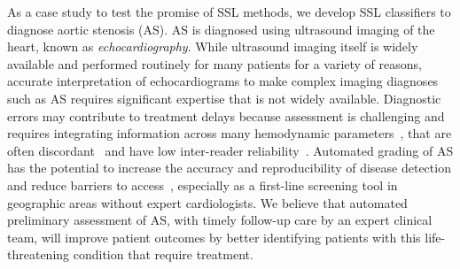 As a case study to test the promise of SSL methods, we develop SSL classifiers to diagnose aortic stenosis (AS). AS is diagnosed using ultrasound imaging of the heart, known as \emph{echocardiography}.
While ultrasound imaging itself is widely available and performed routinely for many patients for a variety of reasons, accurate interpretation of echocardiograms to make complex imaging diagnoses such as AS requires significant expertise that is not widely available.
Diagnostic errors may contribute to treatment delays because assessment is challenging and requires integrating information across many hemodynamic parameters~\citep{baumgartnerRecommendationsEchocardiographicAssessment2017}, that are often discordant~\citep{minnersInconsistenciesEchocardiographicCriteria2008} and have low inter-reader reliability~\citep{sacchiDopplerAssessmentAortic2018}.
Automated grading of AS has the potential to increase the accuracy and reproducibility of disease detection and reduce barriers to access~\citep{batchelorAorticValveStenosis2019}, especially as a first-line screening tool in geographic areas without expert cardiologists.
We believe that automated preliminary assessment of AS, with timely follow-up care by an expert clinical team, will improve patient outcomes by better identifying patients with this life-threatening condition that require treatment.



